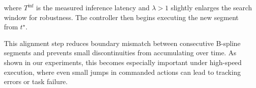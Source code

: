 where $T^{\text{inf}}$ is the measured inference latency and $\lambda > 1$ slightly enlarges the search window for robustness. The controller then begins executing the new segment from $t^\star$.

This alignment step reduces boundary mismatch between consecutive B-spline segments and prevents small discontinuities from accumulating over time. As shown in our experiments, this becomes especially important under high-speed execution, where even small jumps in commanded actions can lead to tracking errors or task failure.


